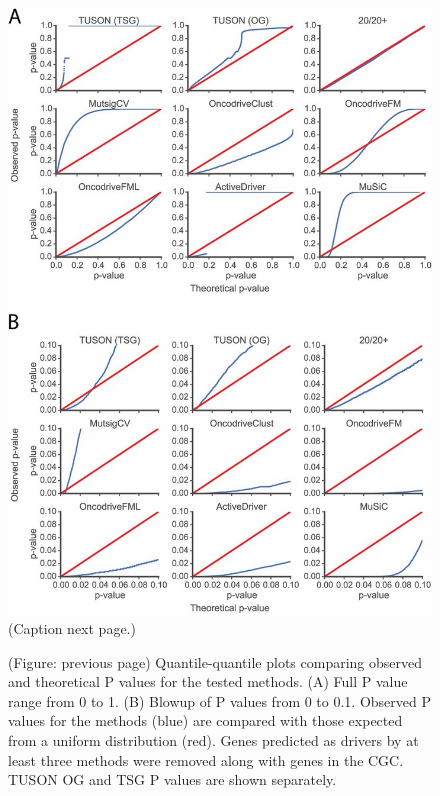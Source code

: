 \begin{figure}[b!]
  \makeatletter
  \let\@currsize\normalsize
  \includegraphics[width=0.9\linewidth]{figures/chapter4/qq_plots.jpg}
  \caption[Quantile-quantile plots comparing observed and theoretical P values]{(Caption next page.)}
  \label{fig:qq_plot}
\end{figure}
\addtocounter{figure}{-1}
\begin{figure} [t!]
  \makeatletter
  \let\@currsize\normalsize
  \caption[(continued) Quantile-quantile plots comparing observed and theoretical P values]{(Figure: previous page) Quantile-quantile plots comparing observed and theoretical P values for the tested methods. (A) Full P value range from 0 to 1. (B) Blowup of P values from 0 to 0.1. Observed P values for the methods (blue) are compared with those expected from a uniform distribution (red). Genes predicted as drivers by at least three methods were removed along with genes in the CGC. TUSON OG and TSG P values are shown separately.}
\end{figure}

